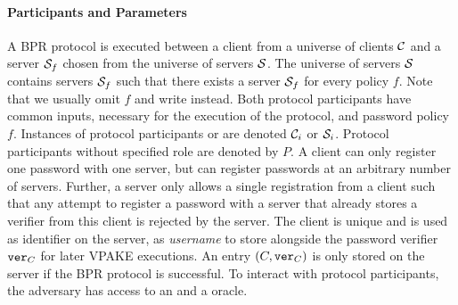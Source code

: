 \paragraph{Participants and Parameters}
A \ac{BPR} protocol is executed between a client \Client from a universe of clients $\mathcal{C}$ and a server $\mathcal{S}_f$ chosen from the universe of servers $\mathcal{S}$.
The universe of servers $\mathcal{S}$ contains servers $\mathcal{S}_f$ such that there exists a server $\mathcal{S}_f$ for every policy $f$.
Note that we usually omit $f$ and write \Server instead.
Both protocol participants have common inputs, necessary for the execution of the protocol, and password policy $f$.
Instances of protocol participants \Client or \Server are denoted $\mathcal{C}_i$ or $\mathcal{S}_i$. 
Protocol participants without specified role are denoted by $P$.
A client can only register one password with one server, but can register passwords at an arbitrary number of servers.
Further, a server only allows a single registration from a client such that any attempt to register a password with a server that already stores a verifier from this client is rejected by the server.
The client \Client is unique and is used as identifier on the server, \ie as \emph{username} to store alongside the password verifier $\mathtt{ver}_C$ for later \ac{VPAKE} executions.
An entry $(C,\mathtt{ver}_C)$ is only stored on the server if the \ac{BPR} protocol is successful.
%
%
%
To interact with protocol participants, the adversary has access to an \Execute and a \Send oracle.

